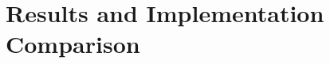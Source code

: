 \documentclass[./main.tex]{subfiles}
\begin{document}
\section{Results and Implementation Comparison}
\label{sec:results_comparison}
\end{document}
